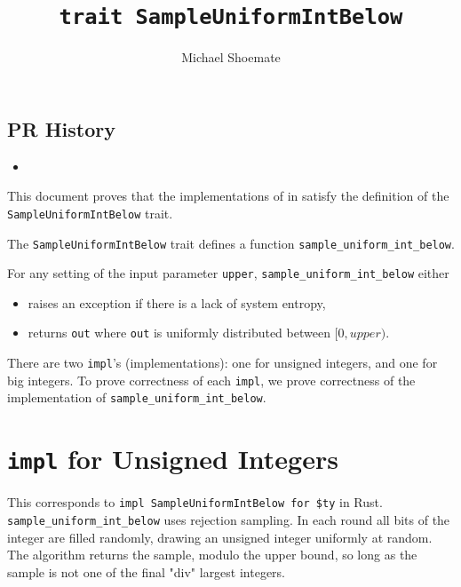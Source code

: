 \documentclass{article}
\title{\texttt{trait SampleUniformIntBelow}}
\author{Michael Shoemate}
\begin{document}
\maketitle

\contrib

\subsection*{PR History}
\begin{itemize}
    \item {}
\end{itemize}

This document proves that the implementations of  in  
satisfy the definition of the \texttt{SampleUniformIntBelow} trait.

\begin{definition}
    \label{sample-uniform-int-below}

    The \texttt{SampleUniformIntBelow} trait defines a function \texttt{sample\_uniform\_int\_below}.

    For any setting of the input parameter \texttt{upper},
    \texttt{sample\_uniform\_int\_below} either
    \begin{itemize}
        \item raises an exception if there is a lack of system entropy,
        \item returns \texttt{out} where \texttt{out} is uniformly distributed between $[0, upper)$.
    \end{itemize}
\end{definition}

There are two \texttt{impl}'s (implementations): one for unsigned integers, and one for big integers.
To prove correctness of each \texttt{impl}, we prove correctness of the implementation of \texttt{sample\_uniform\_int\_below}.

\tableofcontents

\section{\texttt{impl} for Unsigned Integers}
This corresponds to \texttt{impl SampleUniformIntBelow for \$ty} in Rust.
\texttt{sample\_uniform\_int\_below} uses rejection sampling. 
In each round all bits of the integer are filled randomly, drawing an unsigned integer uniformly at random.
The algorithm returns the sample, modulo the upper bound, so long as the sample is not one of the final "div" largest integers.
\end{document}
